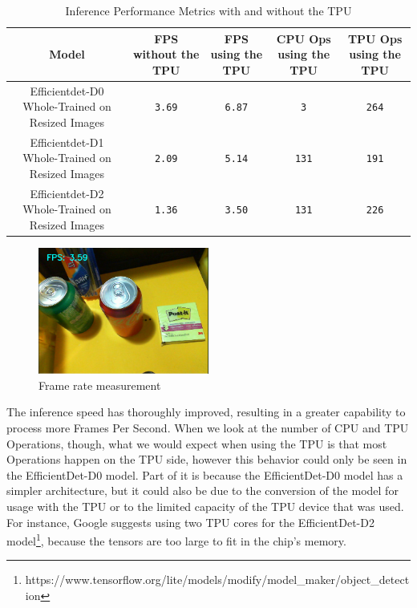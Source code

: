 \documentclass[openright]{normas-utf-tex} %
\begin{document}
\begin{table}[H]
	\centering
	\begin{adjustbox}{width=1\textwidth}
	\label{tab:modelPerformance}
	\begin{tabular}{c|c|c|c|c}
		\hline 
		Model & FPS without the TPU & FPS using the TPU & CPU Ops using the TPU & TPU Ops using the TPU\\
		\hline
        Efficientdet-D0 Whole-Trained on Resized Images & \texttt{3.69} & \texttt{6.87} & \texttt{3} & \texttt{264}\\
		Efficientdet-D1 Whole-Trained on Resized Images & \texttt{2.09} & \texttt{5.14} & \texttt{131} & \texttt{191}\\
		Efficientdet-D2 Whole-Trained on Resized Images & \texttt{1.36} & \texttt{3.50} & \texttt{131} & \texttt{226}\\ 
		\hline 
	\end{tabular}
	\end{adjustbox}
	\caption[Inference Performance Metrics with and without the TPU]{Inference Performance Metrics with and without the TPU}
\end{table}

\begin{figure}[H]
	\centering
	\includegraphics[width=0.5\textwidth]{./images/frameratemeasurement.png}
	\caption[Frame rate measurement]{Frame rate measurement}
\end{figure}

The inference speed has thoroughly improved, resulting in a greater capability to process more 
Frames Per Second. When we look at the number of CPU and TPU Operations, though, what we would
expect when using the TPU is that most Operations happen on the TPU side, however this behavior
could only be seen in the EfficientDet-D0 model. Part of it is because the EfficientDet-D0 model
has a simpler architecture, but it could also be due to the conversion of the model
for usage with the TPU or to the limited capacity of the TPU device that was used. For instance, Google
suggests using two TPU cores for the EfficientDet-D2 model\footnote{https://www.tensorflow.org/lite/models/modify/model\_maker/object\_detection}, 
because the tensors are too large to fit in the chip's memory.
\end{document}
